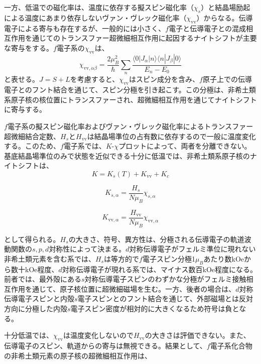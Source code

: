 \documentclass[11pt,a4j]{jreport}
\begin{document}
一方、低温での磁化率は、温度に依存する擬スピン磁化率（$\chi_s$）と結晶場励起による温度にあまり依存しないヴァン・ヴレック磁化率（$\chi_{\text{vv}}$）からなる。伝導電子による寄与も存在するが、一般的には小さく、$f$電子と伝導電子との混成相互作用を通じてのトランスファー超微細相互作用に起因するナイトシフトが主要な寄与をする。$f$電子系の$\chi_{\text{vv}}$は、
\begin{equation}
  \chi_{\text{vv}, \alpha \beta} = \frac{2 \mu_B^2}{\hbar} \sum_{n} \frac{\langle 0 | J_{\alpha} | n \rangle \langle n | J_{\beta} | 0 \rangle}{E_n - E_0}
\end{equation}
と表せる。$J = S + L$を考慮すると、$\chi_{\text{vv}}$はスピン成分を含み、$f$原子上での伝導電子とのフント結合を通じて、スピン分極を引き起こす。この分極は、非希土類系原子核の核位置にトランスファーされ、超微細相互作用を通じてナイトシフトに寄与する。

$f$電子系の擬スピン磁化率およびヴァン・ヴレック磁化率によるトランスファー超微細結合定数、$H_s$と$H_{\text{vv}}$は結晶場準位の占有数に依存するので一般に温度変化する。このため、$f$電子系では、$K$-$\chi$プロットによって、両者を分離できない。基底結晶場準位のみで状態を近似できる十分に低温では、非希土類系原子核のナイトシフトは、
\begin{equation}
K = K_s(T) + K_{\text{vv}} + K_c
\end{equation}

\begin{equation}
K_{s, \alpha} = \frac{H_s}{N \mu_B} \chi_{s, \alpha}
\end{equation}

\begin{equation}
K_{\text{vv}, \alpha} = \frac{H_{\text{vv}}}{N \mu_B} \chi_{\text{vv}, \alpha}
\end{equation}

として得られる。$H_s$の大きさ、符号、異方性は、分極される伝導電子の軌道波動関数の$s, p, d$対称性によって決まる。$d$対称伝導電子がフェルミ準位に現れない非希土類元素を含む系では、$H_s$は等方的で$f$電子スピン分極1$\mu_B$あたり数kOeから数十kOe程度、$d$対称伝導電子が現れる系では、マイナス数百kOe程度になる。前者では、最外殻にある$s$対称伝導電子スピンのわずかな分極がフェルミ接触相互作用を通じて、原子核位置に超微細磁場を生む。一方、後者の場合は、$d$対称伝導電子スピンと内殻$s$電子スピンとのフント結合を通じて、外部磁場とは反対方向に分極した内殻$s$電子スピン密度が相対的に大きくなるため符号は負となる。

十分低温では、$\chi_{\text{vv}}$は温度変化しないので$H_{\text{vv}}$の大きさは評価できない。また、伝導電子のスピン、軌道からの寄与は無視できる。結果として、$f$電子系化合物の非希土類元素の原子核の超微細相互作用は、
\end{document}
